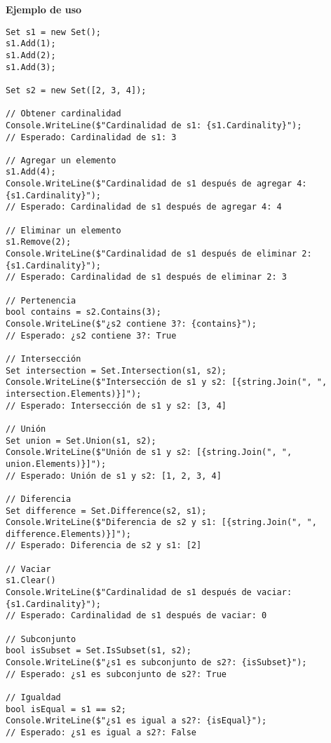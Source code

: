 \textbf{Ejemplo de uso}

\begin{lstlisting}
Set s1 = new Set();
s1.Add(1);
s1.Add(2);
s1.Add(3);

Set s2 = new Set([2, 3, 4]);

// Obtener cardinalidad
Console.WriteLine($"Cardinalidad de s1: {s1.Cardinality}");
// Esperado: Cardinalidad de s1: 3

// Agregar un elemento
s1.Add(4);
Console.WriteLine($"Cardinalidad de s1 después de agregar 4: {s1.Cardinality}");
// Esperado: Cardinalidad de s1 después de agregar 4: 4

// Eliminar un elemento
s1.Remove(2);
Console.WriteLine($"Cardinalidad de s1 después de eliminar 2: {s1.Cardinality}");
// Esperado: Cardinalidad de s1 después de eliminar 2: 3

// Pertenencia
bool contains = s2.Contains(3);
Console.WriteLine($"¿s2 contiene 3?: {contains}");
// Esperado: ¿s2 contiene 3?: True

// Intersección
Set intersection = Set.Intersection(s1, s2);
Console.WriteLine($"Intersección de s1 y s2: [{string.Join(", ", intersection.Elements)}]");
// Esperado: Intersección de s1 y s2: [3, 4]

// Unión
Set union = Set.Union(s1, s2);
Console.WriteLine($"Unión de s1 y s2: [{string.Join(", ", union.Elements)}]");
// Esperado: Unión de s1 y s2: [1, 2, 3, 4]

// Diferencia
Set difference = Set.Difference(s2, s1);
Console.WriteLine($"Diferencia de s2 y s1: [{string.Join(", ", difference.Elements)}]");
// Esperado: Diferencia de s2 y s1: [2]

// Vaciar
s1.Clear()
Console.WriteLine($"Cardinalidad de s1 después de vaciar: {s1.Cardinality}");
// Esperado: Cardinalidad de s1 después de vaciar: 0

// Subconjunto
bool isSubset = Set.IsSubset(s1, s2);
Console.WriteLine($"¿s1 es subconjunto de s2?: {isSubset}");
// Esperado: ¿s1 es subconjunto de s2?: True

// Igualdad
bool isEqual = s1 == s2;
Console.WriteLine($"¿s1 es igual a s2?: {isEqual}");
// Esperado: ¿s1 es igual a s2?: False
\end{lstlisting}